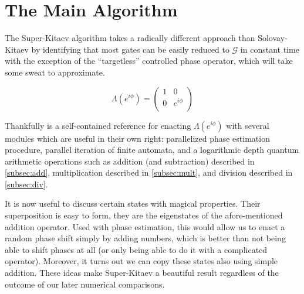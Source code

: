 \section{The Main Algorithm}
\label{sec:main-algo}

The Super-Kitaev algorithm takes a radically different approach than
Solovay-Kitaev by identifying that most gates can be easily reduced to
$\mathcal{G}$ in constant time with the exception of the ``targetless''
controlled phase operator, which will take some sweat to approximate.

\begin{displaymath}
\Lambda(e^{i\phi}) = 
 \left(
  \begin{array}{cc}
    1 & 0 \\
    0 & e^{i\phi} \\
  \end{array} \right)
\end{displaymath}

Thankfully \cite{ksv02} is a self-contained reference
for enacting $\Lambda(e^{i\phi})$ with several modules which are useful in
their own right:
parallelized phase estimation procedure, parallel iteration of finite
automata, and a logarithmic depth quantum arithmetic operations such
as addition (and subtraction) described in \ref{subsec:add},
multiplication described in \ref{subsec:mult}, and division described
in \ref{subsec:div}.

It is now useful to discuss certain states with magical properties.
Their superposition is easy to form, they are the eigenstates of the
afore-mentioned
addition operator. Used with phase estimation, this would allow us to enact
a random phase shift simply by adding numbers, which is better than not
being able to shift phases at all (or only being able to do it with a
complicated operator). Moreover, it turns out we can copy these states
also using simple addition. These ideas make Super-Kitaev a beautiful result
regardless of the outcome of our later numerical comparisons.





